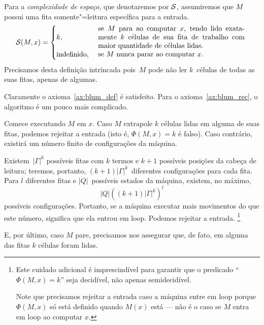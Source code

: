 \begin{example}
    \label{ex:space_complexity}
    Para a \emph{complexidade de espaço},
    que denotaremos por ${\mathcal{S}}$,
    assumiremos que $M$ possui uma fita somente"=leitura
    específica para a entrada.
    \begin{equation*}
        \PhiDS(M, x) = \begin{cases}
            k, & \text{
                \parbox{0.6\textwidth}{
                    se~$M$ para ao computar~$x$,
                    tendo lido exatamente~$k$ células
                    de sua fita de trabalho com maior quantidade de células lidas.
                }
            } \\
            \text{indefinido}, & \text{
                \parbox{0.6\textwidth}{
                    se $M$ nunca parar ao computar $x$.
                }
            }
        \end{cases}
    \end{equation*}
    Precisamos desta definição intrincada
    pois~$M$ pode não ler $k$~células de todas as suas fitas,
    apenas de algumas.

    Claramente o axioma~\ref{ax:blum_def} é satisfeito.
    Para o axioma~\ref{ax:blum_rec},
    o algoritmo é um pouco mais complicado.

    Comece executando $M$ em $x$.
    Caso $M$ extrapole $k$ células lidas
    em alguma de suas fitas,
    podemos rejeitar a entrada
    (isto é, $\Phi(M, x) = k$ é falso).
    Caso contrário,
    existirá um número finito de configurações da máquina.

    Existem~$|\Gamma|^k$ possíveis fitas com $k$ termos
    e $k+1$ possíveis posições da cabeça de leitura;
    teremos, portanto,
    $(k+1)|\Gamma|^k$~diferentes configurações para cada fita.
    Para $l$ diferentes fitas e $|Q|$~possíveis estados da máquina,
    existem, no máximo,
    \begin{equation}
        |Q| \left((k+1)|\Gamma|^k\right)^l
        \label{eq:configurations_count}
    \end{equation}
    possíveis configurações.
    Portanto, se a máquina executar
    mais movimentos do que este número,
    significa que ela entrou em loop.
    Podemos rejeitar a entrada.%
    \footnote{
        Este cuidado adicional é imprescindível
        para garantir que o predicado
        ``$\Phi(M, x) = k$''
        seja decidível,
        não apenas semidecidível.

        Note que precisamos rejeitar a entrada
        caso a máquina entre em loop
        porque $\Phi(M, x)$ só está definido
        quando $M(x)$ está
        --- não é o caso se $M$ entra em loop
        ao computar $x$.
    }

    E, por último,
    caso $M$ pare,
    precisamos nos assegurar que,
    de fato,
    em alguma das fitas $k$ células foram lidas.
\end{example}


